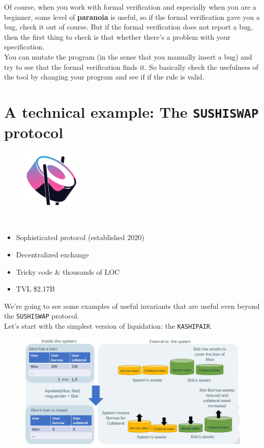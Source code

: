 \documentclass[oneside]{book}
\begin{document}
    Of course, when you work with formal verification and especially when you are a beginner, some level of \textbf{paranoia} is useful, so if the formal verification gave you a bug, check it out of course.
    But if the formal verification does not report a bug, then the first thing to check is that whether there's a problem with your specification.\\

    You can mutate the program (in the sense that you manually insert a bug) and try to see that the formal verification finds it.
    So basically check the usefulness of the tool by changing your program and see if if the rule is valid.\\

    \pagebreak

    \section{A technical example: The \texttt{SUSHISWAP} protocol}

    \begin{figure}
        \centering
        \includegraphics[width=0.25\textwidth]{img/sushiswap}
    \end{figure}
    ~
    \begin{itemize}
        \item Sophisticated protocol (established 2020)
        \item Decentralized exchange
        \item Tricky code \& thousands of LOC
        \item TVL \$2.17B
    \end{itemize}

    We're going to see some examples of useful invariants that are useful even beyond the \texttt{SUSHISWAP} protocol.\\

    Let's start with the simplest version of liquidation: the \texttt{KASHIPAIR}.

    \begin{figure}[htbp!]
        \centering
        \includegraphics[width=\linewidth]{img/kashipair}
    \end{figure}
\end{document}
